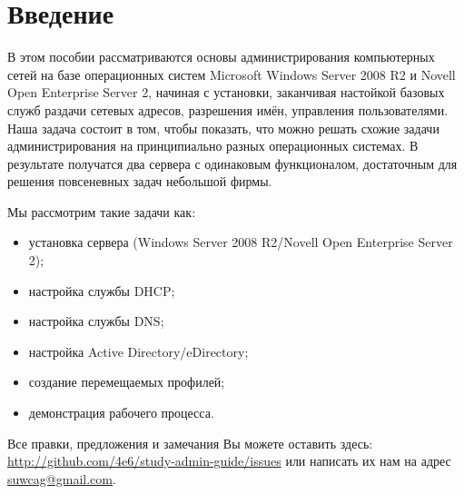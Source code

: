 \documentclass[a4paper,12pt]{article}
\begin{document}

\restoregeometry
\tableofcontents
\newpage

{}
\section*{Введение}
В этом пособии рассматриваются основы администрирования компьютерных сетей на базе операционных систем Microsoft Windows Server 2008 R2 и Novell Open Enterprise Server 2, начиная с установки, заканчивая настойкой базовых служб раздачи сетевых адресов, разрешения имён, управления пользователями. Наша задача состоит в том, чтобы показать, что можно решать схожие задачи администрирования на принципиально разных операционных системах. В результате получатся два сервера с одинаковым функционалом, достаточным для решения повсеневных задач небольшой фирмы.
\par
Мы рассмотрим такие задачи как:
\begin{itemize}
\item установка сервера (Windows Server 2008 R2/Novell Open Enterprise Server 2);
\item настройка службы DHCP;
\item настройка службы DNS;
\item настройка Active Directory/eDirectory;
\item создание перемещаемых профилей;
\item демонстрация рабочего процесса.
\end{itemize}
\par
Все правки, предложения и замечания Вы можете оставить здесь: \url{http://github.com/4e6/study-admin-guide/issues} или написать их нам на адрес \href{mailto:suwcag@gmail.com}{suwcag@gmail.com}.
\cleardoublepage

\cleardoublepage

\cleardoublepage	

\newpage
\end{document}
